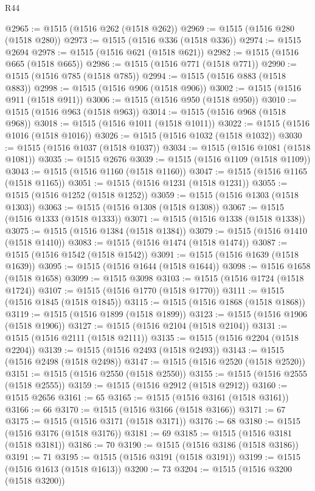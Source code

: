 \begin{lexlean}{R44}
\begin{coremodule}
{@2965 := @1515 (@1516 @262 (@1518 @262))
@2969 := @1515 (@1516 @280 (@1518 @280))
@2973 := @1515 (@1516 @336 (@1518 @336))
@2974 := @1515 @2694
@2978 := @1515 (@1516 @621 (@1518 @621))
@2982 := @1515 (@1516 @665 (@1518 @665))
@2986 := @1515 (@1516 @771 (@1518 @771))
@2990 := @1515 (@1516 @785 (@1518 @785))
@2994 := @1515 (@1516 @883 (@1518 @883))
@2998 := @1515 (@1516 @906 (@1518 @906))
@3002 := @1515 (@1516 @911 (@1518 @911))
@3006 := @1515 (@1516 @950 (@1518 @950))
@3010 := @1515 (@1516 @963 (@1518 @963))
@3014 := @1515 (@1516 @968 (@1518 @968))
@3018 := @1515 (@1516 @1011 (@1518 @1011))
@3022 := @1515 (@1516 @1016 (@1518 @1016))
@3026 := @1515 (@1516 @1032 (@1518 @1032))
@3030 := @1515 (@1516 @1037 (@1518 @1037))
@3034 := @1515 (@1516 @1081 (@1518 @1081))
@3035 := @1515 @2676
@3039 := @1515 (@1516 @1109 (@1518 @1109))
@3043 := @1515 (@1516 @1160 (@1518 @1160))
@3047 := @1515 (@1516 @1165 (@1518 @1165))
@3051 := @1515 (@1516 @1231 (@1518 @1231))
@3055 := @1515 (@1516 @1252 (@1518 @1252))
@3059 := @1515 (@1516 @1303 (@1518 @1303))
@3063 := @1515 (@1516 @1308 (@1518 @1308))
@3067 := @1515 (@1516 @1333 (@1518 @1333))
@3071 := @1515 (@1516 @1338 (@1518 @1338))
@3075 := @1515 (@1516 @1384 (@1518 @1384))
@3079 := @1515 (@1516 @1410 (@1518 @1410))
@3083 := @1515 (@1516 @1474 (@1518 @1474))
@3087 := @1515 (@1516 @1542 (@1518 @1542))
@3091 := @1515 (@1516 @1639 (@1518 @1639))
@3095 := @1515 (@1516 @1644 (@1518 @1644))
@3098 := @1516 @1658 (@1518 @1658)
@3099 := @1515 @3098
@3103 := @1515 (@1516 @1724 (@1518 @1724))
@3107 := @1515 (@1516 @1770 (@1518 @1770))
@3111 := @1515 (@1516 @1845 (@1518 @1845))
@3115 := @1515 (@1516 @1868 (@1518 @1868))
@3119 := @1515 (@1516 @1899 (@1518 @1899))
@3123 := @1515 (@1516 @1906 (@1518 @1906))
@3127 := @1515 (@1516 @2104 (@1518 @2104))
@3131 := @1515 (@1516 @2111 (@1518 @2111))
@3135 := @1515 (@1516 @2204 (@1518 @2204))
@3139 := @1515 (@1516 @2493 (@1518 @2493))
@3143 := @1515 (@1516 @2498 (@1518 @2498))
@3147 := @1515 (@1516 @2520 (@1518 @2520))
@3151 := @1515 (@1516 @2550 (@1518 @2550))
@3155 := @1515 (@1516 @2555 (@1518 @2555))
@3159 := @1515 (@1516 @2912 (@1518 @2912))
@3160 := @1515 @2656
@3161 := 65
@3165 := @1515 (@1516 @3161 (@1518 @3161))
@3166 := 66
@3170 := @1515 (@1516 @3166 (@1518 @3166))
@3171 := 67
@3175 := @1515 (@1516 @3171 (@1518 @3171))
@3176 := 68
@3180 := @1515 (@1516 @3176 (@1518 @3176))
@3181 := 69
@3185 := @1515 (@1516 @3181 (@1518 @3181))
@3186 := 70
@3190 := @1515 (@1516 @3186 (@1518 @3186))
@3191 := 71
@3195 := @1515 (@1516 @3191 (@1518 @3191))
@3199 := @1515 (@1516 @1613 (@1518 @1613))
@3200 := 73
@3204 := @1515 (@1516 @3200 (@1518 @3200))
}
\end{coremodule}
\end{lexlean}
